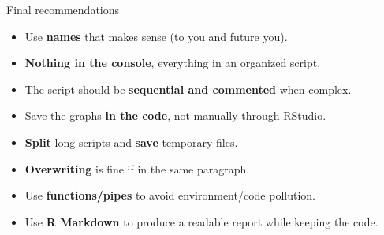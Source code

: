 \documentclass[10pt]{beamer}
\begin{document}
\begin{frame}{Final recommendations}
  \begin{itemize}
  \item Use \textbf{names} that makes sense (to you and future you).
  \item \textbf{Nothing in the console}, everything in an organized script.
  \item The script should be \textbf{sequential and commented} when complex.
  \item Save the graphs \textbf{in the code}, not manually through RStudio.
  \item \textbf{Split} long scripts and \textbf{save} temporary files.
  \item \textbf{Overwriting} is fine if in the same paragraph.
  \item Use \textbf{functions/pipes} to avoid environment/code pollution.
  \item Use \textbf{R Markdown} to produce a readable report while keeping the code.
  \end{itemize}
\end{frame}
\end{document}
